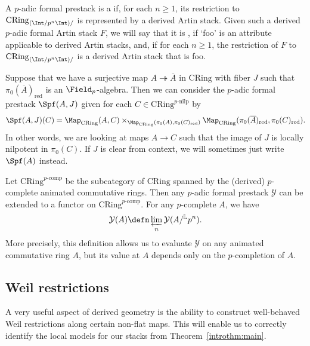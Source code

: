 \documentclass[10pt]{amsart}
\begin{document}
\begin{definition}
A $p$-adic formal prestack is a  if, for each $n\ge 1$, its restriction to $\mathrm{CRing}_{(\Int/p^n\Int)/}$ is represented by a derived Artin stack. Given such a derived $p$-adic formal Artin stack $F$, we will say that it is , if `foo' is an attribute applicable to derived Artin stacks, and, if for each $n\ge 1$, the restriction of $F$ to $\mathrm{CRing}_{(\Int/p^n\Int)/}$ is a derived Artin stack that is foo.
\end{definition}



\begin{definition}
Suppose that we have a surjective map $A\twoheadrightarrow\overline{A}$ in $\mathrm{CRing}$ with fiber $J$ such that $\pi_0(\overline{A})_{\mathrm{red}}$ is an $\Field_p$-algebra. Then we can consider the $p$-adic formal prestack $\Spf(A,J)$ given for each $C\in \mathrm{CRing}^{p\text{-nilp}}$ by
\[
\Spf(A,J)(C) = \Map_{\mathrm{CRing}}(A,C)\times_{\Map_{\mathrm{CRing}}(\pi_0(A),\pi_0(C)_{\mathrm{red}})}\Map_{\mathrm{CRing}}(\pi_0(\overline{A})_{\mathrm{red}},\pi_0(C)_{\mathrm{red}}).
\]
In other words, we are looking at maps $A\to C$ such that the image of $J$ is locally nilpotent in $\pi_0(C)$. If $J$ is clear from context, we will sometimes just write $\Spf(A)$ instead.
\end{definition}

\begin{remark}
Let $\mathrm{CRing}^{p\text{-comp}}$ be the subcategory of $\mathrm{CRing}$ spanned by the (derived) $p$-complete animated commutative rings. Then any $p$-adic formal prestack $\mathcal{Y}$ can be extended to a functor on $\mathrm{CRing}^{p\text{-comp}}$. For any $p$-complete $A$, we have
\[
\mathcal{Y}(A) \defn \varprojlim_{n}\mathcal{Y}(A/{}^{\mathbb{L}}p^n).
\]
More precisely, this definition allows us to evaluate $\mathcal{Y}$ on any animated commutative ring $A$, but its value at $A$ depends only on the $p$-completion of $A$.
\end{remark}   


\subsection{Weil restrictions}
\label{subsec:weil}
A very useful aspect of derived geometry is the ability to construct well-behaved Weil restrictions along certain non-flat maps. This will enable us to correctly identify the local models for our stacks from Theorem~\ref{introthm:main}.
\end{document}
